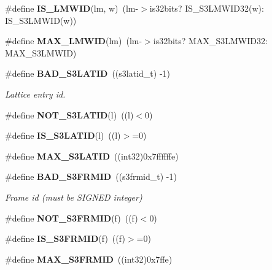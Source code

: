 \begin{DoxyCompactItemize}
\item 
\#define {\bfseries I\-S\-\_\-\-L\-M\-W\-I\-D}(lm, w)~(lm-\/$>$is32bits? I\-S\-\_\-\-S3\-L\-M\-W\-I\-D32(w)\-: I\-S\-\_\-\-S3\-L\-M\-W\-I\-D(w))\label{s3types_8h_a5575e741f21ef511fd4ee70fc5cbd6b3}

\item 
\#define {\bfseries M\-A\-X\-\_\-\-L\-M\-W\-I\-D}(lm)~(lm-\/$>$is32bits? M\-A\-X\-\_\-\-S3\-L\-M\-W\-I\-D32\-: M\-A\-X\-\_\-\-S3\-L\-M\-W\-I\-D)\label{s3types_8h_ad3a57931b80d8ac88424201e45a07ebc}

\item 
\#define {\bf B\-A\-D\-\_\-\-S3\-L\-A\-T\-I\-D}~((s3latid\-\_\-t) -\/1)\label{s3types_8h_a4dc7d8594d7789aef5ca7dd2ec2e6d85}

\begin{DoxyCompactList}\small\item\em Lattice entry id. \end{DoxyCompactList}\item 
\#define {\bfseries N\-O\-T\-\_\-\-S3\-L\-A\-T\-I\-D}(l)~((l)$<$0)\label{s3types_8h_a2899476244b1a12c9813bb366b5061fc}

\item 
\#define {\bfseries I\-S\-\_\-\-S3\-L\-A\-T\-I\-D}(l)~((l)$>$=0)\label{s3types_8h_ada5024b91faf1b97c7fa04adf2f51d13}

\item 
\#define {\bfseries M\-A\-X\-\_\-\-S3\-L\-A\-T\-I\-D}~((int32)0x7ffffffe)\label{s3types_8h_af30e82546f464c726f01cc0b17b7eebf}

\item 
\#define {\bf B\-A\-D\-\_\-\-S3\-F\-R\-M\-I\-D}~((s3frmid\-\_\-t) -\/1)\label{s3types_8h_a564e6d8072efdbd932b413007e4897c1}

\begin{DoxyCompactList}\small\item\em Frame id (must be S\-I\-G\-N\-E\-D integer) \end{DoxyCompactList}\item 
\#define {\bfseries N\-O\-T\-\_\-\-S3\-F\-R\-M\-I\-D}(f)~((f)$<$0)\label{s3types_8h_a7bd95ea9e40790c7d9d1917c121ed432}

\item 
\#define {\bfseries I\-S\-\_\-\-S3\-F\-R\-M\-I\-D}(f)~((f)$>$=0)\label{s3types_8h_a903531cb550f4258304dac0a9fea160b}

\item 
\#define {\bfseries M\-A\-X\-\_\-\-S3\-F\-R\-M\-I\-D}~((int32)0x7ffe)\label{s3types_8h_a10aa0ceb75567a7318108b337e8b253a}


\end{DoxyCompactItemize}
